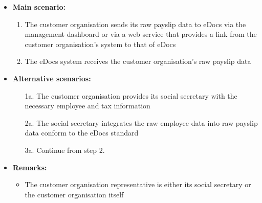 \documentclass[a4paper,10pt]{article}
\begin{document}
\begin{itemize}
    \item \textbf{Main scenario:} 
    \begin{enumerate}
       \item The customer organisation sends its raw payslip data to eDocs via the management dashboard or via a web service that provides a link from the customer organisation's system to that of eDocs
       \item The eDocs system receives the customer organisation's raw payslip data
    \end{enumerate}
    \item \textbf{Alternative scenarios:} 
    \begin{enumerate}
        \item [1a.] The customer organisation provides its social secretary with the necessary employee and tax information
        \item [2a.] The social secretary integrates the raw employee data into raw payslip data conform to the eDocs standard
        \item [3a.] Continue from step 2.
    \end{enumerate}
    \item \textbf{Remarks:}
        \begin{itemize}
        	\item The customer organisation representative is either its social secretary or the customer organisation itself
        \end{itemize}
\end{itemize}
\end{document}
